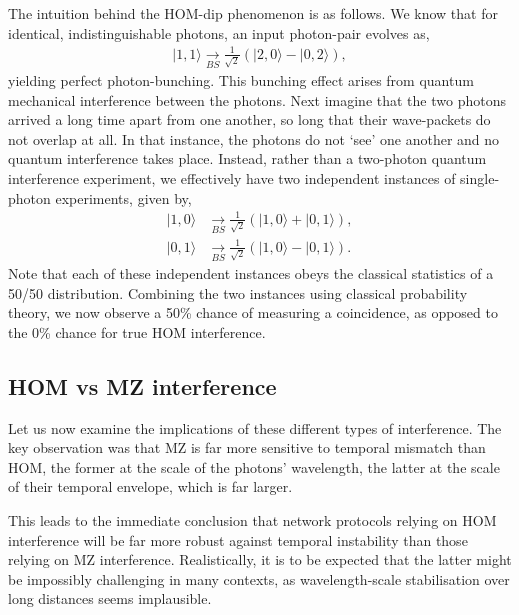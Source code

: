 \documentclass[aps, rmp, twocolumn, amsmath, amssymb, nofootinbib, superscriptaddress, longbibliography, floatfix, table-of-contents, eqsecnum]{revtex4-1}
\newcommand{\ket}[1]{|#1\rangle}
\begin{document}
The intuition behind the HOM-dip phenomenon is as follows. We know that for identical, indistinguishable photons, an input photon-pair evolves as,
\begin{align}
\ket{1,1} \underset{BS}{\to} \frac{1}{\sqrt{2}}(\ket{2,0}-\ket{0,2}),
\end{align}
yielding perfect photon-bunching. This bunching effect arises from quantum mechanical interference between the photons. Next imagine that the two photons arrived a long time apart from one another, so long that their wave-packets do not overlap at all. In that instance, the photons do not `see' one another and no quantum interference takes place. Instead, rather than a two-photon quantum interference experiment, we effectively have two independent instances of single-photon experiments, given by,
\begin{align}
\ket{1,0} &\underset{BS}{\to} \frac{1}{\sqrt{2}}(\ket{1,0}+\ket{0,1}), \nonumber \\	
\ket{0,1} &\underset{BS}{\to} \frac{1}{\sqrt{2}}(\ket{1,0}-\ket{0,1}).
\end{align}
Note that each of these independent instances obeys the classical statistics of a 50/50 distribution. Combining the two instances using classical probability theory, we now observe a 50\% chance of measuring a coincidence, as opposed to the 0\% chance for true HOM interference.

%
%

\subsection{HOM vs MZ interference} 

Let us now examine the implications of these different types of interference. The key observation was that MZ is far more sensitive to temporal mismatch than HOM, the former at the scale of the photons' wavelength, the latter at the scale of their temporal envelope, which is far larger.

This leads to the immediate conclusion that network protocols relying on HOM interference will be far more robust against temporal instability than those relying on MZ interference. Realistically, it is to be expected that the latter might be impossibly challenging in many contexts, as wavelength-scale stabilisation over long distances seems implausible.
\end{document}
